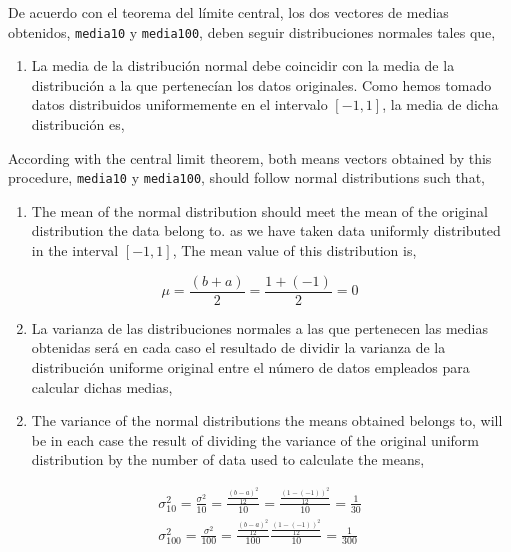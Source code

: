 \begin{paracol}{2}
De acuerdo con el teorema del límite central, los dos vectores de medias obtenidos, \texttt{media10} y \texttt{media100}, deben seguir distribuciones normales tales que,
\begin{enumerate}
\item La media de la distribución normal debe coincidir con la media de la distribución a la que pertenecían los datos originales. Como hemos tomado datos distribuidos uniformemente en el intervalo $[-1,1]$, la media de dicha distribución es,
\end{enumerate}
\switchcolumn
According with the central limit theorem, both means vectors obtained by this procedure,  \texttt{media10} y \texttt{media100}, should follow normal distributions such that, 
\begin{enumerate}
	\item The mean of the normal distribution sho\-uld meet the mean of the original distribution the data belong to. as we have taken data uniformly distributed in the interval $[-1,1]$, The mean value of this distribution is,
\end{enumerate}

\end{paracol}
\begin{equation*}
\mu = \frac{(b+a)}{2}=\frac{1+(-1)}{2}=0
\end{equation*}
\begin{paracol}{2}
\begin{enumerate}
\setcounter{enumi}{1}
\item La varianza de las distribuciones normales a las que pertenecen las medias obtenidas será en cada caso el resultado de dividir la varianza de la distribución uniforme original entre el número de datos empleados para calcular dichas medias,
\end{enumerate}
\switchcolumn
\begin{enumerate}
	\setcounter{enumi}{1}
	\item The variance of the normal distributions the means obtained belongs to, will be in each case the result of dividing the variance of the original uniform distribution by the number of data used to calculate the means, 
\end{enumerate}
\end{paracol}

\begin{align*}
\sigma_{10}^2 = \frac{\sigma^2}{10}=\frac{\frac{(b-a)^2}{12}}{10}=\frac{\frac{(1-(-1))^2}{12}}{10}=\frac{1}{30}\\
\sigma_{100}^2 = \frac{\sigma^2}{100}=\frac{\frac{(b-a)^2}{12}}{100}\frac{\frac{(1-(-1))^2}{12}}{10}=\frac{1}{300}
\end{align*}


